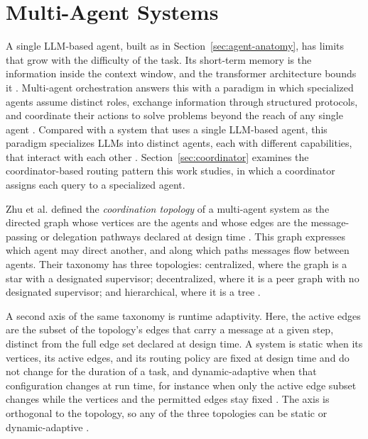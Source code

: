 \section{Multi-Agent Systems}
\label{sec:multi-agent}

A single LLM-based agent, built as in Section~\ref{sec:agent-anatomy}, has limits that grow with the difficulty of the task. Its short-term memory is the information inside the context window, and the transformer architecture bounds it \cite{wangSurveyLargeLanguage2024}. Multi-agent orchestration answers this with a paradigm in which specialized agents assume distinct roles, exchange information through structured protocols, and coordinate their actions to solve problems beyond the reach of any single agent \cite{zhuLLMBasedMultiAgentOrchestration2026a}. Compared with a system that uses a single LLM-based agent, this paradigm specializes LLMs into distinct agents, each with different capabilities, that interact with each other \cite{guoLargeLanguageModel2024}. Section~\ref{sec:coordinator} examines the coordinator-based routing pattern this work studies, in which a coordinator assigns each query to a specialized agent.

Zhu et al. defined the \emph{coordination topology} of a multi-agent system as the directed graph whose vertices are the agents and whose edges are the message-passing or delegation pathways declared at design time \cite{zhuLLMBasedMultiAgentOrchestration2026a}. This graph expresses which agent may direct another, and along which paths messages flow between agents. Their taxonomy has three topologies: centralized, where the graph is a star with a designated supervisor; decentralized, where it is a peer graph with no designated supervisor; and hierarchical, where it is a tree \cite{zhuLLMBasedMultiAgentOrchestration2026a}.

A second axis of the same taxonomy is runtime adaptivity. Here, the active edges are the subset of the topology's edges that carry a message at a given step, distinct from the full edge set declared at design time. A system is static when its vertices, its active edges, and its routing policy are fixed at design time and do not change for the duration of a task, and dynamic-adaptive when that configuration changes at run time, for instance when only the active edge subset changes while the vertices and the permitted edges stay fixed \cite{zhuLLMBasedMultiAgentOrchestration2026a}. The axis is orthogonal to the topology, so any of the three topologies can be static or dynamic-adaptive \cite{zhuLLMBasedMultiAgentOrchestration2026a}.

